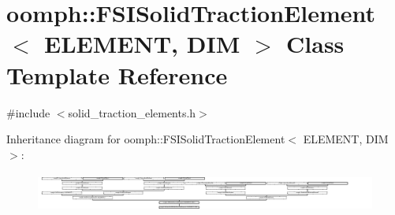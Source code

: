 \hypertarget{classoomph_1_1FSISolidTractionElement}{}\section{oomph\+:\+:F\+S\+I\+Solid\+Traction\+Element$<$ E\+L\+E\+M\+E\+NT, D\+IM $>$ Class Template Reference}
\label{classoomph_1_1FSISolidTractionElement}


{\ttfamily \#include $<$solid\+\_\+traction\+\_\+elements.\+h$>$}

Inheritance diagram for oomph\+:\+:F\+S\+I\+Solid\+Traction\+Element$<$ E\+L\+E\+M\+E\+NT, D\+IM $>$\+:\begin{figure}[H]
\begin{center}
\leavevmode
\includegraphics[height=1.310160cm]{classoomph_1_1FSISolidTractionElement}
\end{center}
\end{figure}
